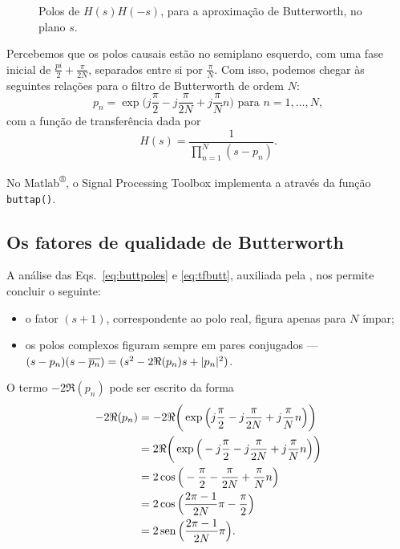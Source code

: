 \begin{figure}[hbtp]
\caption{Polos de $H(s)H(-s)$, para a aproximação de Butterworth, no plano $s$.}
\label{fig:splane}
\end{figure}

Percebemos que os polos causais estão no semiplano esquerdo, com uma fase inicial de $\frac{pi}{2}+\frac{\pi}{2N}$, separados entre si por $\frac{\pi}{N}$. Com isso, podemos chegar às seguintes relações para o filtro de Butterworth de ordem $N$:
\begin{equation}\label{eq:buttpoles}
	\boxed{p_n=\exp\Big(j\frac{\pi}{2}-j\frac{\pi}{2N}+j\frac{\pi}{N}n\Big)\text{ para }n=1,\ldots,N,}
\end{equation}
com a função de transferência dada por
\begin{equation}\label{eq:tfbutt}
	\boxed{H(s)=\frac{1}{\displaystyle\prod_{n=1}^{N}(s-p_n)}.}
\end{equation}

No Matlab\textsuperscript{®}, o Signal Processing Toolbox implementa a  através da função \lstinline{buttap()}.

\subsection{Os fatores de qualidade de Butterworth}

A análise das Eqs.~\eqref{eq:buttpoles} e \eqref{eq:tfbutt}, auxiliada pela , nos permite concluir o seguinte:
\begin{itemize}
	\item o fator $(s+1)$, correspondente ao polo real, figura apenas para $N$ ímpar;
	\item os polos complexos figuram sempre em pares conjugados --- $(s-p_n)(s-\overline{p_n})=(s^2-2\Re(p_n)s+|p_n|^2)$.
\end{itemize}

O termo $-2\Re(p_n)$ pode ser escrito da forma
\begin{align}
	-2\Re(p_n)&=-2\Re\bigg(\exp\Big(j\frac{\pi}{2}-j\frac{\pi}{2N}+j\frac{\pi}{N}n\Big)\bigg)\notag\\
			  &=2\Re\bigg(\exp\Big(-j\frac{\pi}{2}-j\frac{\pi}{2N}+j\frac{\pi}{N}n\Big)\bigg)\notag\\
			  &=2\cos\Big(-\frac{\pi}{2}-\frac{\pi}{2N}+\frac{\pi}{N}n\Big)\notag\\
			  &=2\cos\Big(\frac{2\pi-1}{2N}\pi-\frac{\pi}{2}\Big)\notag\\
			  &=2\sin\Big(\frac{2\pi-1}{2N}\pi\Big).
\end{align}


